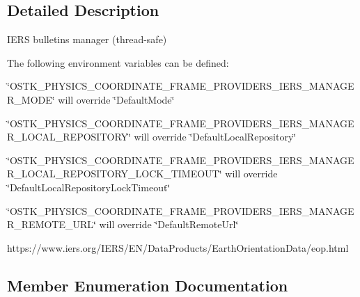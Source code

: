 \subsection{Detailed Description}
I\+E\+RS bulletins manager (thread-\/safe) 

The following environment variables can be defined\+:


\begin{DoxyItemize}
\item \char`\"{}\+O\+S\+T\+K\+\_\+\+P\+H\+Y\+S\+I\+C\+S\+\_\+\+C\+O\+O\+R\+D\+I\+N\+A\+T\+E\+\_\+\+F\+R\+A\+M\+E\+\_\+\+P\+R\+O\+V\+I\+D\+E\+R\+S\+\_\+\+I\+E\+R\+S\+\_\+\+M\+A\+N\+A\+G\+E\+R\+\_\+\+M\+O\+D\+E\char`\"{} will override \char`\"{}\+Default\+Mode\char`\"{}
\item \char`\"{}\+O\+S\+T\+K\+\_\+\+P\+H\+Y\+S\+I\+C\+S\+\_\+\+C\+O\+O\+R\+D\+I\+N\+A\+T\+E\+\_\+\+F\+R\+A\+M\+E\+\_\+\+P\+R\+O\+V\+I\+D\+E\+R\+S\+\_\+\+I\+E\+R\+S\+\_\+\+M\+A\+N\+A\+G\+E\+R\+\_\+\+L\+O\+C\+A\+L\+\_\+\+R\+E\+P\+O\+S\+I\+T\+O\+R\+Y\char`\"{} will override \char`\"{}\+Default\+Local\+Repository\char`\"{}
\item \char`\"{}\+O\+S\+T\+K\+\_\+\+P\+H\+Y\+S\+I\+C\+S\+\_\+\+C\+O\+O\+R\+D\+I\+N\+A\+T\+E\+\_\+\+F\+R\+A\+M\+E\+\_\+\+P\+R\+O\+V\+I\+D\+E\+R\+S\+\_\+\+I\+E\+R\+S\+\_\+\+M\+A\+N\+A\+G\+E\+R\+\_\+\+L\+O\+C\+A\+L\+\_\+\+R\+E\+P\+O\+S\+I\+T\+O\+R\+Y\+\_\+\+L\+O\+C\+K\+\_\+\+T\+I\+M\+E\+O\+U\+T\char`\"{} will override \char`\"{}\+Default\+Local\+Repository\+Lock\+Timeout\char`\"{}
\item \char`\"{}\+O\+S\+T\+K\+\_\+\+P\+H\+Y\+S\+I\+C\+S\+\_\+\+C\+O\+O\+R\+D\+I\+N\+A\+T\+E\+\_\+\+F\+R\+A\+M\+E\+\_\+\+P\+R\+O\+V\+I\+D\+E\+R\+S\+\_\+\+I\+E\+R\+S\+\_\+\+M\+A\+N\+A\+G\+E\+R\+\_\+\+R\+E\+M\+O\+T\+E\+\_\+\+U\+R\+L\char`\"{} will override \char`\"{}\+Default\+Remote\+Url\char`\"{}
\end{DoxyItemize}

https\+://www.iers.\+org/\+I\+E\+R\+S/\+E\+N/\+Data\+Products/\+Earth\+Orientation\+Data/eop.html 

\subsection{Member Enumeration Documentation}
\mbox{\label{classostk_1_1physics_1_1coord_1_1frame_1_1provider_1_1iers_1_1_manager_a3a8dd1081d1094069417687b4a3f16ba}} 
